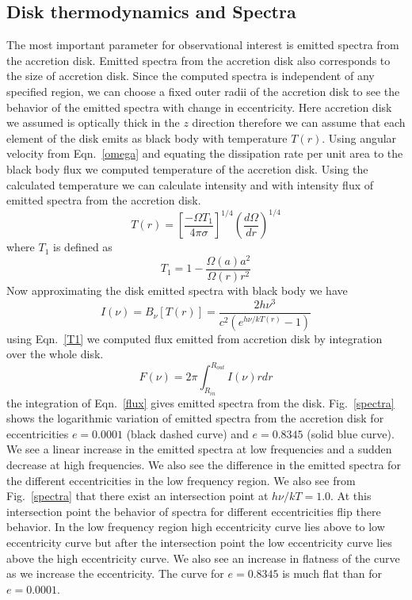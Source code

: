 \documentclass[useAMS,usenatbib]{mn2e}
\begin{document}
\subsection{Disk thermodynamics and Spectra}
The most important parameter for observational interest is emitted spectra from the accretion disk. Emitted spectra from the accretion disk also corresponds to the size of accretion disk. Since the computed spectra is independent of any specified region, we can choose a fixed outer radii of the accretion disk to see the behavior of the emitted spectra with change in eccentricity. Here accretion disk we assumed is optically thick in the $z$ direction therefore we can assume that each element of the disk emits as black body with temperature $T(r)$. Using angular velocity from Eqn.~\ref{omega} and equating the dissipation rate per unit area to the black body flux we computed temperature of the accretion disk. Using the calculated temperature we can calculate intensity and with intensity flux of emitted spectra from the accretion disk.
\begin{equation}
T(r) = \left[\frac{-\Omega T_1}{4\pi\sigma}\right]^{1/4}\left(\frac{d\Omega}{dr}\right)^{1/4}
\label{temp}
\end{equation}
where $T_1$ is defined as
\begin{equation}
T_1 = 1 - \frac{\Omega(a)a^2}{\Omega(r)r^2}
\label{T1}
\end{equation}
Now approximating the disk emitted spectra with black body we have
\begin{equation}
I(\nu) = B_{\nu}[T(r)] = \frac{2h\nu^3}{c^2(e^{h\nu/kT(r)} -1)}
\end{equation}
using Eqn.~\ref{T1} we computed flux emitted from accretion disk by integration over the whole disk.
\begin{equation}
F(\nu) = 2\pi\int^{R_{out}}_{R_{in}}I(\nu)rdr
\label{flux}
\end{equation}
the integration of Eqn.~\ref{flux} gives emitted spectra from the disk. Fig.~\ref{spectra} shows the logarithmic variation of emitted spectra from the accretion disk for eccentricities $e = 0.0001$ (black dashed curve) and $e = 0.8345$ (solid blue curve). We see a linear increase in the emitted spectra at low frequencies and a sudden decrease at high frequencies. We also see the difference in the emitted spectra for the different eccentricities in the low frequency region. We also see from Fig.~\ref{spectra} that there exist an intersection point at $h\nu/kT = 1.0$. At this intersection point the behavior of spectra for different eccentricities flip there behavior. In the low frequency region high eccentricity curve lies above to low eccentricity curve but after the intersection point the low eccentricity curve lies above the high eccentricity curve. We also see an increase in flatness of the curve as we increase the eccentricity. The curve for $e = 0.8345$ is much flat than for $e = 0.0001$. 
\end{document}
